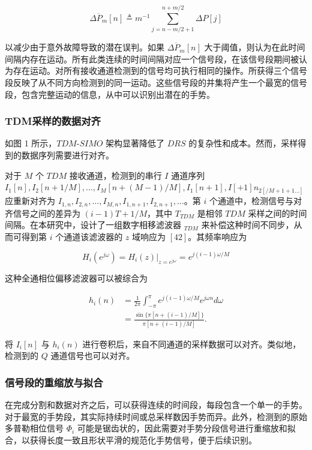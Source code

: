 \begin{TranslationNoMiniToc}
\begin{equation}
\overline{\Delta P_m}[n] \triangleq m^{-1} \sum_{j=n-m/2+1}^{n+m/2} \Delta P[j]
\end{equation}

以减少由于意外故障导致的潜在误判。如果 $\overline{\Delta P_m}[n]$ 大于阈值，则认为在此时间间隔内存在运动。所有此类连续的时间间隔对应一个信号段，在该信号段期间被认为存在运动。对所有接收通道检测到的信号均可执行相同的操作。所获得三个信号段反映了从不同方向检测到的同一运动。这些信号段的并集将产生一个最宽的信号段，包含完整运动的信息，从中可以识别出潜在的手势。

\subsubsection{TDM采样的数据对齐}
如图 1 所示，$TDM$-$SIMO$ 架构显著降低了 $DRS$ 的复杂性和成本。然而，采样得到的数据序列需要进行对齐。

对于 $M$ 个 $TDM$ 接收通道，检测到的串行 $I$ 通道序列 $I_1[n], I_2[n+1/M], \dots, I_M[n+(M-1)/M], I_1[n+1], I[+1]n_{2[/M+1+1 \dots]}$ 应重新对齐为 $I_{1,n}, I_{2,n}, \dots, I_{M,n}, I_{1,n+1}, I_{2,n+1}, \dots$。第 $i$ 个通道中，检测信号与对齐信号之间的差异为 $(i-1)T+1/M$，其中 $T_{TDM}$ 是相邻 $TDM$ 采样之间的时间间隔。在本研究中，设计了一组数字相移滤波器 $_{TDM}$ 来补偿这种时间不同步，从而可得到第 $i$ 个通道该滤波器的 $z$ 域响应为 $[42]$。其频率响应为

\begin{equation}
H_i(e^{j\omega}) = H_i(z)|_{z=e^{j\omega}} = e^{j(i-1)\omega/M}
\end{equation}

这种全通相位偏移滤波器可以被综合为

\begin{equation}
\begin{aligned}
h_i(n) &= \frac{1}{2\pi} \int_{-\pi}^{\pi} e^{j(i-1)\omega/M} e^{j\omega n} d\omega \\
&= \frac{\sin\{\pi[n + (i - 1)/M]\}}{\pi[n + (i - 1)/M]}.
\end{aligned}
\end{equation}

将 $I_i[n]$ 与 $h_i(n)$ 进行卷积后，来自不同通道的采样数据可以对齐。类似地，检测到的 $Q$ 通道信号也可以对齐。

\subsubsection{信号段的重缩放与拟合}
在完成分割和数据对齐之后，可以获得连续的时间段，每段包含一个单一的手势。对于最宽的手势段，其实际持续时间或总采样数因手势而异。此外，检测到的原始多普勒相位信号 $\Phi_i$ 可能是锯齿状的，因此需要对手势分段信号进行重缩放和拟合，以获得长度一致且形状平滑的规范化手势信号，便于后续识别。


\end{TranslationNoMiniToc}
